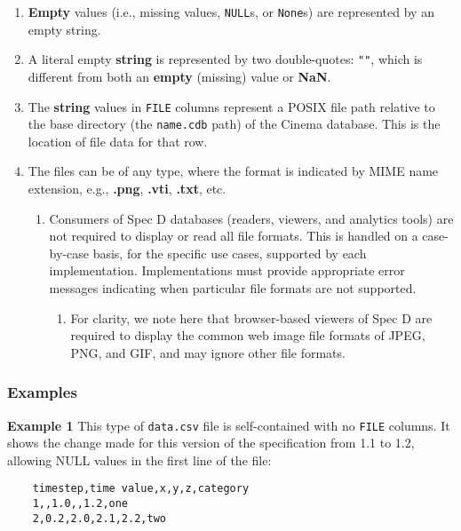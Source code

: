 \begin{enumerate}
\begin{enumerate}
\item \textbf{Empty} values (i.e., missing values, \texttt{\small NULL}s, or 
\texttt{\small None}s) are represented by an empty string.  
\item A literal empty \textbf{string} is represented by two double-quotes: 
\texttt{""}, which is different from both an \textbf{empty} (missing) value or 
\textbf{NaN}. 
\item The \textbf{string} values in \texttt{\small FILE} columns represent
a POSIX file path relative to the base directory (the \texttt{\small name.cdb} 
path) of the Cinema database. This is the location of file data for that 
row.
\item The files can be of any type, where the format is indicated by MIME name 
  extension, e.g., \textbf{.png}, \textbf{.vti}, \textbf{.txt}, etc.
\begin{enumerate}
\item Consumers of Spec D databases (readers, viewers, and analytics tools) are
not required to display or read all file formats. This is handled on a
case-by-case basis, for the specific use cases, supported by each
implementation.  Implementations must provide appropriate error messages
indicating when particular file formats are not supported. 
\begin{enumerate}
\item For clarity, we note here that browser-based viewers of Spec D are 
required to display the common web image file formats of JPEG, PNG, and GIF, 
and may ignore other file formats.
\end{enumerate}
\end{enumerate}
\end{enumerate}
\end{enumerate}

\subsubsection{Examples}

\noindent
\textbf{Example 1} This type of \texttt{\small data.csv} file is 
self-contained with no \texttt{\small FILE} columns. It shows the 
change made for this version of the specification from 1.1 to 1.2, allowing 
NULL values in the first line of the file:

\begin{verbatim}
    timestep,time value,x,y,z,category
    1,,1.0,,1.2,one
    2,0.2,2.0,2.1,2.2,two
\end{verbatim}

